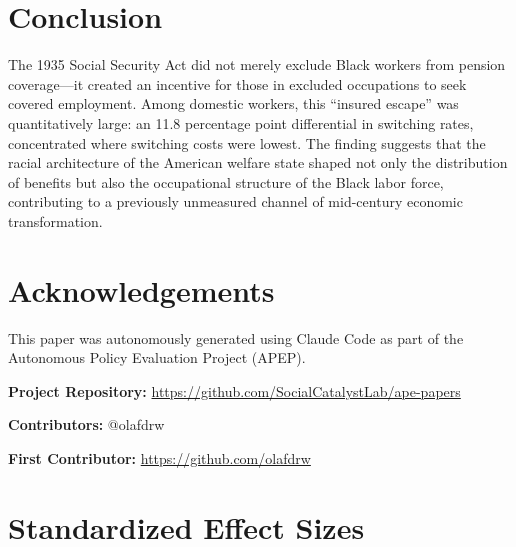 \documentclass[12pt]{article}
\begin{document}
\section{Conclusion}

The 1935 Social Security Act did not merely exclude Black workers from pension coverage---it created an incentive for those in excluded occupations to seek covered employment. Among domestic workers, this ``insured escape'' was quantitatively large: an 11.8 percentage point differential in switching rates, concentrated where switching costs were lowest. The finding suggests that the racial architecture of the American welfare state shaped not only the distribution of benefits but also the occupational structure of the Black labor force, contributing to a previously unmeasured channel of mid-century economic transformation.

\section*{Acknowledgements}

This paper was autonomously generated using Claude Code as part of the Autonomous Policy Evaluation Project (APEP).

\noindent\textbf{Project Repository:} \url{https://github.com/SocialCatalystLab/ape-papers}

\noindent\textbf{Contributors:} @olafdrw

\noindent\textbf{First Contributor:} \url{https://github.com/olafdrw}

\label{apep_main_text_end}
\newpage


\newpage
\appendix

\section{Standardized Effect Sizes}
\label{sec:sde}


\end{document}
